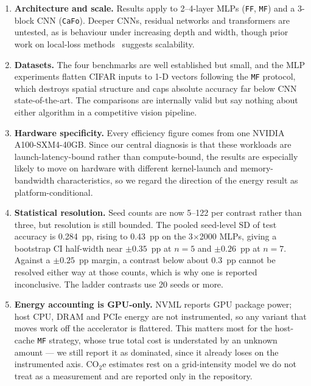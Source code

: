 \documentclass{llncs}
\newcommand{\FF}{\texttt{FF}}
\newcommand{\MF}{\texttt{MF}}
\newcommand{\CaFo}{\texttt{CaFo}}
\begin{document}
\begin{enumerate}
  \item \textbf{Architecture and scale.} Results apply to 2--4-layer MLPs
        (\FF{}, \MF{}) and a 3-block CNN (\CaFo{}). Deeper CNNs, residual
        networks and transformers are untested, as is behaviour under
        increasing depth and width, though prior work on local-loss
        methods~\cite{ren2023scaling} suggests scalability.
  \item \textbf{Datasets.} The four benchmarks are well established but
        small, and the MLP experiments flatten CIFAR inputs to 1-D vectors
        following the \MF{} protocol, which destroys spatial structure and
        caps absolute accuracy far below CNN state-of-the-art. The
        comparisons are internally valid but say nothing about either
        algorithm in a competitive vision pipeline.
  \item \textbf{Hardware specificity.} Every efficiency figure comes from one
        NVIDIA A100-SXM4-40GB. Since our central diagnosis is that these
        workloads are launch-latency-bound rather than compute-bound, the
        results are especially likely to move on hardware with different
        kernel-launch and memory-bandwidth characteristics, so we regard the
        direction of the energy result as platform-conditional.
  \item \textbf{Statistical resolution.} Seed counts are now
        \numrange{5}{122} per contrast rather than three, but resolution is
        still bounded. The pooled seed-level SD of test accuracy is
        \num{0.284}~pp, rising to \num{0.43}~pp on the 3$\times$2000 MLPs,
        giving a bootstrap CI half-width near $\pm\num{0.35}$~pp at $n=5$
        and $\pm\num{0.26}$~pp at $n=7$. Against a $\pm\num{0.25}$~pp
        margin, a contrast below about \num{0.3}~pp cannot be resolved
        either way at those counts, which is why one is reported
        inconclusive. The ladder contrasts use \num{20} seeds or more.
  \item \textbf{Energy accounting is GPU-only.} NVML reports GPU package
        power; host CPU, DRAM and PCIe energy are not instrumented, so any
        variant that moves work off the accelerator is flattered. This
        matters most for the host-cache \MF{} strategy, whose true total
        cost is understated by an unknown amount --- we still report it as
        dominated, since it already loses on the instrumented axis. CO$_2$e
        estimates rest on a grid-intensity model we do not treat as a
        measurement and are reported only in the repository.

\end{enumerate}
\end{document}
